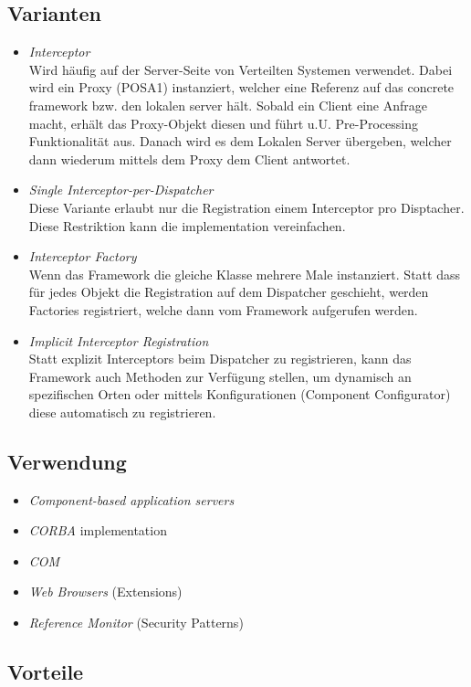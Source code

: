 \subsection{Varianten}
\begin{itemize}
	\item \emph{Interceptor}\\
	Wird häufig auf der Server-Seite von Verteilten Systemen verwendet. Dabei wird ein Proxy (POSA1) instanziert, welcher eine Referenz auf das concrete framework bzw. den lokalen server hält. Sobald ein Client eine Anfrage macht, erhält das Proxy-Objekt diesen und führt u.U. Pre-Processing Funktionalität aus. Danach wird es dem Lokalen Server übergeben, welcher dann wiederum mittels dem Proxy dem Client antwortet.
	\item \emph{Single Interceptor-per-Dispatcher}\\
	Diese Variante erlaubt nur die Registration einem Interceptor pro Disptacher. Diese Restriktion kann die implementation vereinfachen.
	\item \emph{Interceptor Factory}\\
	Wenn das Framework die gleiche Klasse mehrere Male instanziert. Statt dass für jedes Objekt die Registration auf dem Dispatcher geschieht, werden Factories registriert, welche dann vom Framework aufgerufen werden.
	\item \emph{Implicit Interceptor Registration}\\
	Statt explizit Interceptors beim Dispatcher zu registrieren, kann das Framework auch Methoden zur Verfügung stellen, um dynamisch an spezifischen Orten oder mittels Konfigurationen (Component Configurator) diese automatisch zu registrieren.
\end{itemize}


\subsection{Verwendung}

\begin{itemize}
	\item \emph{Component-based application servers}
	\item \emph{CORBA} implementation
	\item \emph{COM}
	\item \emph{Web Browsers} (Extensions)
	\item \emph{Reference Monitor} (Security Patterns)
\end{itemize}


\subsection{Vorteile}

